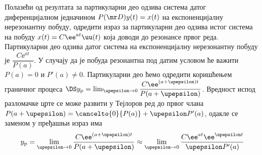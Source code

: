 \PID Полазећи од резултата за партикуларни део одзива система датог диференцијалном једначином
$P(\mr D) y(t) = x(t)$ на експоненцијалну нерезонантну побуду, одредити израз за партикуларни део 
одзива истог система на побуду $x(t) = C\ee^{at}\uu(t)$ која доводи до резонансе првог реда. \\

\RESENJE  Партикуларни део одзива датог система на експоненцијалну нерезонантну побуду
је $\dfrac{C\ee^{at}}{P(a)}$. У случају да је побуда резонантна под датим условом ће важити
$P(a) = 0$ и $P'(a) \neq 0$. Партикуларни део ћемо одредити коришћењем граничног процеса 
$\DS y_{\rm p} = \lim_{\upepsilon\to 0}\dfrac{C\ee^{(a+\upepsilon)t}}{P(a + \upepsilon)}$. 
Вредност испод разломачке црте се може развити у Тејлоров ред до првог члана 
$P(a+\upepsilon) = \cancelto{0}{P(a)} + \upepsilon P'(a)$, одакле се заменом у пређашњи 
израз има
\begin{equation}
    y_{\rm p} = \lim_{\upepsilon\to 0}\dfrac{C\ee^{(a+\upepsilon)t}}{P(a + \upepsilon)} \approx 
    \lim_{\upepsilon\to 0}\dfrac{C\ee^{a t} \ee^{\upepsilon t}}{\upepsilon P'(a) }
\end{equation}